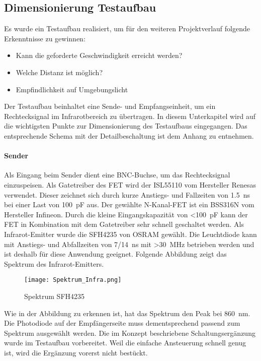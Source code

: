 \subsection{Dimensionierung Testaufbau}
Es wurde ein Testaufbau realisiert, um für den weiteren Projektverlauf folgende Erkenntnisse zu gewinnen:
\begin{itemize}
	\item Kann die geforderte Geschwindigkeit erreicht werden?
	\item Welche Distanz ist möglich?
	\item Empfindlichkeit auf Umgebungslicht 
\end{itemize}
Der Testaufbau beinhaltet eine Sende- und Empfangseinheit, um ein Rechtecksignal im Infrarotbereich zu übertragen. 
In diesem Unterkapitel wird auf die wichtigsten Punkte zur Dimensionierung des Testaufbaus eingegangen. Das entsprechende Schema mit der Detailbeschaltung ist dem Anhang zu entnehmen.
\paragraph{Sender} 
Als Eingang beim Sender dient eine BNC-Buchse, um das Rechtecksignal einzuspeisen. Als Gatetreiber des FET wird der ISL55110 vom Hersteller Renesas verwendet. Dieser zeichnet sich durch kurze Anstiegs- und Fallzeiten von \SI{1.5}{ns} bei einer Last von \SI{100}{pF} aus.
Der gewählte N-Kanal-FET ist ein BSS316N vom Hersteller Infineon. Durch die kleine Eingangskapazität von \textless \SI{100}{pF} kann der FET in Kombination mit dem Gatetreiber sehr schnell geschaltet werden.
Als Infrarot-Emitter wurde die SFH4235 von OSRAM gewählt. Die Leuchtdiode kann mit Anstiegs- und Abfallzeiten von 7/\SI{14}{ns} mit \textgreater \SI{30}{MHz} betrieben werden und ist deshalb für diese Anwendung geeignet. Folgende Abbildung zeigt das Spektrum des Infrarot-Emitters.

\begin{figure}[h]
	\centering
	\texttt{[image: Spektrum\_Infra.png]}
	\caption{Spektrum SFH4235}\label{fig:Spektrum_Infra}
\end{figure}

Wie in der Abbildung zu erkennen ist, hat das Spektrum den Peak bei \SI{860}{nm}. Die Photodiode auf der Empfängerseite muss dementsprechend passend zum Spektrum ausgewählt werden. Die im Konzept beschriebene Schaltungsergänzung wurde im Testaufbau vorbereitet. Weil die einfache Ansteuerung schnell genug ist, wird die Ergänzung vorerst nicht bestückt.

